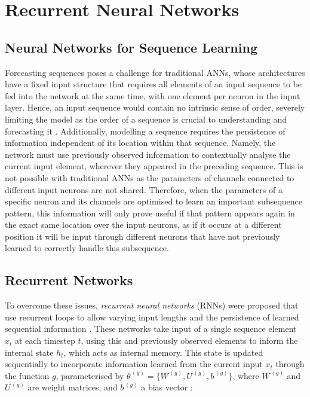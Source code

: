 \documentclass[a4paper, 11pt]{report}
\begin{document}
    \section{Recurrent Neural Networks}

    \subsection{Neural Networks for Sequence Learning}

    Forecasting sequences poses a challenge for traditional ANNs, whose architectures have a fixed input structure that requires all elements of an input sequence to be fed into the network at the same time, with one element per neuron in the input layer. Hence, an input sequence would contain no intrinsic sense of order, severely limiting the model as the order of a sequence is crucial to understanding and forecasting it \citep{tsantekidis-2022}. Additionally, modelling a sequence requires the persistence of information independent of its location within that sequence. Namely, the network must use previously observed information to contextually analyse the current input element, wherever they appeared in the preceding sequence. This is not possible with traditional ANNs as the parameters of channels connected to different input neurons are not shared. Therefore, when the parameters of a specific neuron and its channels are optimised to learn an important subsequence pattern, this information will only prove useful if that pattern appears again in the exact same location over the input neurons, as if it occurs at a different position it will be input through different neurons that have not previously learned to correctly handle this subsequence.


    \subsection{Recurrent Networks}

    To overcome these issues, \emph{recurrent neural networks} (RNNs) were proposed that use recurrent loops to allow varying input lengths and the persistence of learned sequential information \citep{sharma-2022}. These networks take input of a single sequence element $x_t$ at each timestep $t$, using this and previously observed elements to inform the internal state $h_t$, which acts as internal memory. This state is updated sequentially to incorporate information learned from the current input $x_t$ through the function $g$, parameterised by $\theta^{\,(g)} = \big\{ W^{\,(g)}, U^{\,(g)}, b^{\,(g)} \big\}$, where $W^{\,(g)}$ and $U^{\,(g)}$ are weight matrices, and $b^{\,(g)}$ a bias vector \citep{sharma-2022}:
\end{document}

